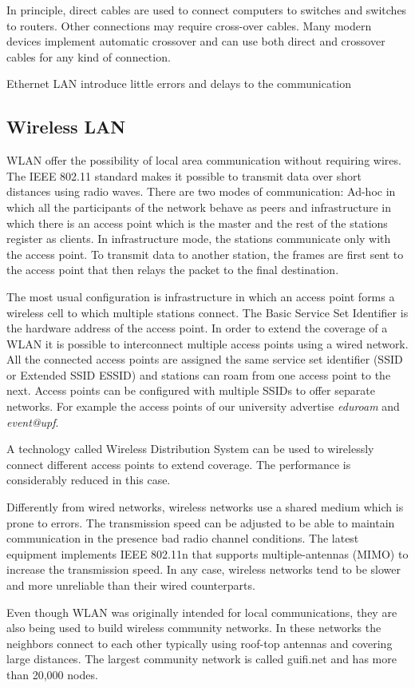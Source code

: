 In principle, direct cables are used to connect computers to switches and switches to routers.
Other connections may require cross-over cables.
Many modern devices implement automatic crossover and can use both direct and crossover cables for any kind of connection.

Ethernet LAN introduce little errors and delays to the communication

\subsection{Wireless LAN}

WLAN offer the possibility of local area communication without requiring wires.
The IEEE 802.11 standard makes it possible to transmit data over short distances using radio waves.
There are two modes of communication: Ad-hoc in which all the participants of the network behave as peers and infrastructure in which there is an access point which is the master and the rest of the stations register as clients.
In infrastructure mode, the stations communicate only with the access point.
To transmit data to another station, the frames are first sent to the access point that then relays the packet to the final destination.


The most usual configuration is infrastructure in which an access point forms a wireless cell to which multiple stations connect.
The Basic Service Set Identifier is the hardware address of the access point.
In order to extend the coverage of a WLAN it is possible to interconnect multiple access points using a wired network.
All the connected access points are assigned the same service set identifier (SSID or Extended SSID ESSID) and stations can roam from one access point to the next.
Access points can be configured with multiple SSIDs to offer separate networks.
For example the access points of our university advertise \emph{eduroam} and \emph{event@upf}.

A technology called Wireless Distribution System can be used to wirelessly connect different access points to extend coverage.
The performance is considerably reduced in this case.

Differently from wired networks, wireless networks use a shared medium which is prone to errors.
The transmission speed can be adjusted to be able to maintain communication in the presence bad radio channel conditions.
The latest equipment implements IEEE 802.11n that supports multiple-antennas (MIMO) to increase the transmission speed.
In any case, wireless networks tend to be slower and more unreliable than their wired counterparts.

Even though WLAN was originally intended for local communications, they are also being used to build wireless community networks.
In these networks the neighbors connect to each other typically using roof-top antennas and covering large distances.
The largest community network is called guifi.net and has more than 20,000 nodes.

